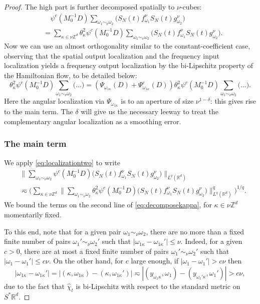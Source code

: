 \documentclass{amsart}
\numberwithin{equation}{section}
\theoremstyle{definition}
\newcommand{\Rd}{\mathbb{R}^{d}}
\newcommand{\Z}{\mathbb{Z}}
\newcommand {\ka}{\kappa}
\newcommand {\Sp}{S^{*}\Rd}
\newcommand {\w}{\omega}
\begin{document}
\begin{proof}
The high part is further decomposed spatially to $\nu$-cubes:
\begin{equation*}
\begin{split}
    &\quad \psi^c(M_0^{-1} D) \sum_{\w_{1}\sim_{\nu}\w_{2}} \big(S_{N}(t)f^{\nu}_{\w_{1}}S_{N}(t)g^{\nu}_{\w_{2}}\big) \\ &= \sum_{\kappa \in \nu \Z^d} \theta_{\kappa}^2 \psi^c(M_0^{-1} D) \sum_{\w_{1}\sim_{\nu}\w_{2}} \big(S_{N}(t)f^{\nu}_{\w_{1}}S_{N}(t)g^{\nu}_{\w_{2}}\big).
\end{split}
\end{equation*}
Now we can use an almost orthogonality similar to the constant-coefficient case, observing that the spatial output localization and the frequency input localization yields a frequency output localization by the bi-Lipschitz property of the Hamiltonian flow, to be detailed below:
\begin{equation*}
    \theta_{\kappa}^2 \psi^c(M_0^{-1} D) \sum_{\w_{1}\sim_{\nu}\w_{2}} \big( \ldots \big) = (\Psi_{\omega_{1 \kappa}}(D) + \Psi_{\omega_{1 \kappa}}^c(D)) \theta_{\kappa}^2 \psi^c(M_0^{-1} D) \sum_{\w_{1}\sim_{\nu}\w_{2}} \big( \ldots \big).
\end{equation*}
Here the angular localization via $\Psi_{\omega_{1 \kappa}}$ is to an aperture of size $\nu^{1-\delta}$: this gives rise to the main term.
The $\delta$ will give us the necessary leeway to treat the complementary angular localization as a smoothing error.

\subsubsection*{The main term}

We apply \eqref{eq:localizationtwo} to write
\begin{equation}\label{eq:decomposekappa}
\begin{aligned}
&\Big\|\sum_{\w_{1}\sim_{\nu}\w_{2}} \psi^c(M_{0}^{-1}D) \big(S_{N}(t)f^{\nu}_{\w_{1}}S_{N}(t)g^{\nu}_{\w_{2}}\big)\Big\|_{L^{q}(\Rd)}\\
&\eqsim \Big(\sum_{\kappa\in\nu\Z^{d}}\Big\|\sum_{\w_{1}\sim_{\nu}\w_{2}}\theta^2_{\ka} \psi^c(M_{0}^{-1}D) \big(S_{N}(t)f^{\nu}_{\w_{1}}S_{N}(t)g^{\nu}_{\w_{2}}\big)\Big\|_{L^{q}(\Rd)}^{q}\Big)^{1/q}.
\end{aligned}
\end{equation}
We bound the terms on the second line of \eqref{eq:decomposekappa}, for $\ka\in\nu\Z^{d}$ momentarily fixed. 

To this end, note that for a given pair $\w_{1}\sim_{\nu}\w_{2}$, there are no more than a fixed finite number of pairs $\w_{1}'\sim_{\nu}\w_{2}'$ such that $|\w_{1\ka}-\w_{1\ka}'|\leq \nu$. Indeed, for 
a given $c>0$, there are at most a fixed finite number of pairs $\w_{1}'\sim_{\nu}\w_{2}'$ such that $|\w_{1}-\w_{1}'|\leq c\nu$. On the other hand, for $c$ large enough, if $|\w_{1}-\w_{1}'|>c\nu$ then 
\[
|\w_{1\ka}-\w_{1\ka}'|=|(\ka,\w_{1\ka})-(\ka,\w_{1\ka}')|\eqsim |(y_{\w_{1}\ka},\w_{1})-(y_{\w_{1}'\ka},\w_{1}')|>c\nu,
\]
due to the fact that $\hat{\chi}_{t}$ is bi-Lipschitz with respect to the standard metric on $\Sp$. 


\end{proof}
\end{document}
